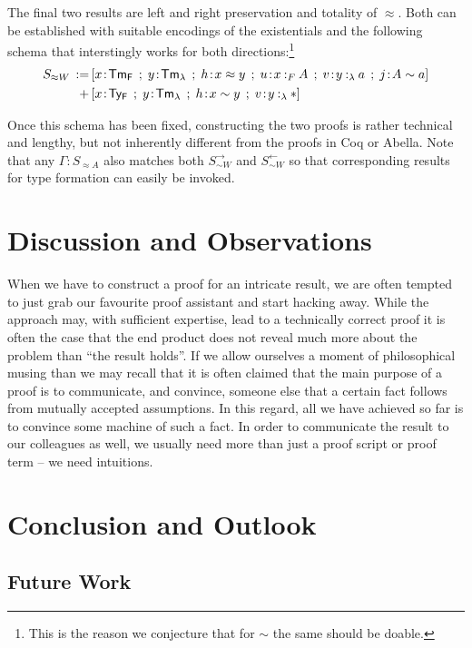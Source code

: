 \documentclass[a4paper,UKenglish]{lipics-v2016}
\newcommand{\ms}{\,}
\newcommand{\mrel}[1]{\mathrel{\ms #1 \ms}}
\newcommand{\eqdef}{\mrel{:=}}
\newcommand{\TyF}{\ensuremath{\mathsf{Ty_{F}}}}
\newcommand{\TmF}{\ensuremath{\mathsf{Tm_{F}}}}
\newcommand{\TmL}{\ensuremath{\mathsf{Tm_{\lambda}}}}
\newcommand{\of}{\ensuremath{\!:\!}}
\newcommand{\typingFh}[2]{\ensuremath{#1 \mathbin{:_{F}} #2}}
\newcommand{\typingLh}[2]{\ensuremath{#1 \mathbin{:_{\lambda}} #2}}
\newcommand{\tyr}{\mathrel{\sim}}
\newcommand{\tmr}{\mathrel{\approx}}
\newcommand{\Prp}{\ensuremath{\textrm{\textasteriskcentered}}}
\begin{document}
The final two results are left and right preservation and totality of $\tmr$.
Both can be established with suitable encodings of the existentials and the following schema that interstingly works for both directions:\footnote{This is the reason we conjecture that for $\tyr$ the same should be doable.}
\begin{align*}
  S_{\tmr W} \eqdef &[x\of\TmF \mrel{;} y\of\TmL \mrel{;} h\of x \tmr y \mrel{;} u\of\typingFh{x}{A} \mrel{;} v\of\typingLh{y}{a} \mrel{;} j \of A \tyr a]\\
  \mrel{+} &[x\of\TyF \mrel{;} y\of\TmL \mrel{;} h\of x \tyr y \mrel{;} v\of\typingLh{y}{\Prp}]
\end{align*}

Once this schema has been fixed, constructing the two proofs is rather technical and lengthy, but not inherently different from the proofs in Coq or Abella.
Note that any $\Gamma \of S_{\tmr A}$ also matches both $S_{\tyr W}^{\rightarrow}$ and $S_{\tyr W}^{\leftarrow}$ so that corresponding results for type formation can easily be invoked.

\section{Discussion and Observations}
\label{sec:disc-observ}

When we have to construct a proof for an intricate result, we are often tempted to just grab our favourite proof assistant and start hacking away.
While the approach may, with sufficient expertise, lead to a technically correct proof it is often the case that the end product does not reveal much more about the problem than ``the result holds''.
If we allow ourselves a moment of philosophical musing than we may recall that it is often claimed that the main purpose of a proof is to communicate, and convince, someone else that a certain fact follows from mutually accepted assumptions.
In this regard, all we have achieved so far is to convince some machine of such a fact.
In order to communicate the result to our colleagues as well, we usually need more than just a proof script or proof term -- we need intuitions.


\section{Conclusion and Outlook}
\label{sec:conclusion}

\subsection{Future Work}
\label{sec:future-work}
\end{document}
